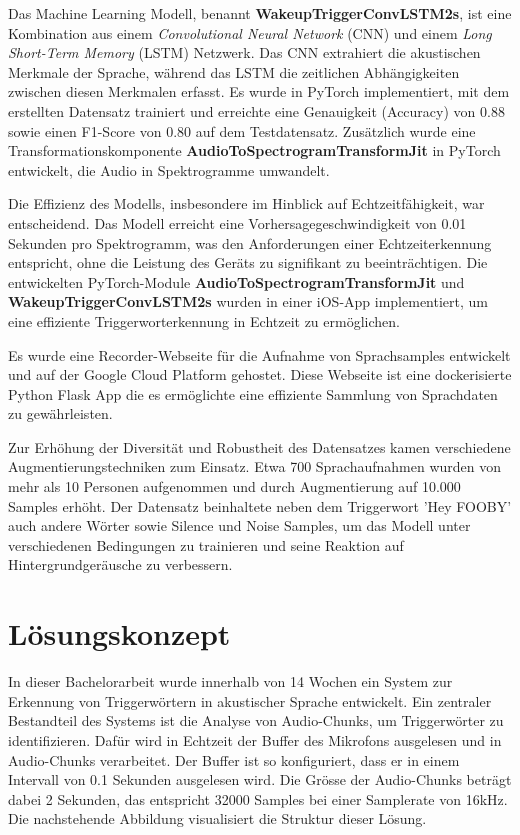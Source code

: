 \documentclass[11pt,a4paper]{article}
\begin{document}
\noindent
Das Machine Learning Modell, benannt \textbf{WakeupTriggerConvLSTM2s}, ist eine Kombination aus einem \textit{Convolutional Neural Network} (CNN) und einem \textit{Long Short-Term Memory} (LSTM) Netzwerk. Das CNN extrahiert die akustischen Merkmale der Sprache, während das LSTM die zeitlichen Abhängigkeiten zwischen diesen Merkmalen erfasst. Es wurde in PyTorch implementiert, mit dem erstellten Datensatz trainiert und erreichte eine Genauigkeit (Accuracy) von 0.88 sowie einen F1-Score von 0.80 auf dem Testdatensatz. Zusätzlich wurde eine Transformationskomponente \textbf{AudioToSpectrogramTransformJit} in PyTorch entwickelt, die Audio in Spektrogramme umwandelt.

\noindent \newline
Die Effizienz des Modells, insbesondere im Hinblick auf Echtzeitfähigkeit, war entscheidend. Das Modell erreicht eine Vorhersagegeschwindigkeit von 0.01 Sekunden pro Spektrogramm, was den Anforderungen einer Echtzeiterkennung entspricht, ohne die Leistung des Geräts zu signifikant zu beeinträchtigen. Die entwickelten PyTorch-Module \textbf{AudioToSpectrogramTransformJit} und \textbf{WakeupTriggerConvLSTM2s} wurden in einer iOS-App implementiert, um eine effiziente Triggerworterkennung in Echtzeit zu ermöglichen.

\noindent \newline
Es wurde eine Recorder-Webseite für die Aufnahme von Sprachsamples entwickelt und auf der Google Cloud Platform gehostet. Diese Webseite ist eine dockerisierte Python Flask App die es ermöglichte eine effiziente Sammlung von Sprachdaten zu gewährleisten.

\noindent \newline
Zur Erhöhung der Diversität und Robustheit des Datensatzes kamen verschiedene Augmentierungstechniken zum Einsatz. Etwa 700 Sprachaufnahmen wurden von mehr als 10 Personen aufgenommen und durch Augmentierung auf 10.000 Samples erhöht. Der Datensatz beinhaltete neben dem Triggerwort 'Hey FOOBY' auch andere Wörter sowie Silence und Noise Samples, um das Modell unter verschiedenen Bedingungen zu trainieren und seine Reaktion auf Hintergrundgeräusche zu verbessern.


\newpage
\section{Lösungskonzept}
In dieser Bachelorarbeit wurde innerhalb von 14 Wochen ein System zur Erkennung von Triggerwörtern in akustischer Sprache entwickelt. Ein zentraler Bestandteil des Systems ist die Analyse von Audio-Chunks, um Triggerwörter zu identifizieren. Dafür wird in Echtzeit der Buffer des Mikrofons ausgelesen und in Audio-Chunks verarbeitet. Der Buffer ist so konfiguriert, dass er in einem Intervall von 0.1 Sekunden ausgelesen wird. Die Grösse der Audio-Chunks beträgt dabei 2 Sekunden, das entspricht 32000 Samples bei einer Samplerate von 16kHz. Die nachstehende Abbildung visualisiert die Struktur dieser Lösung.
\end{document}
